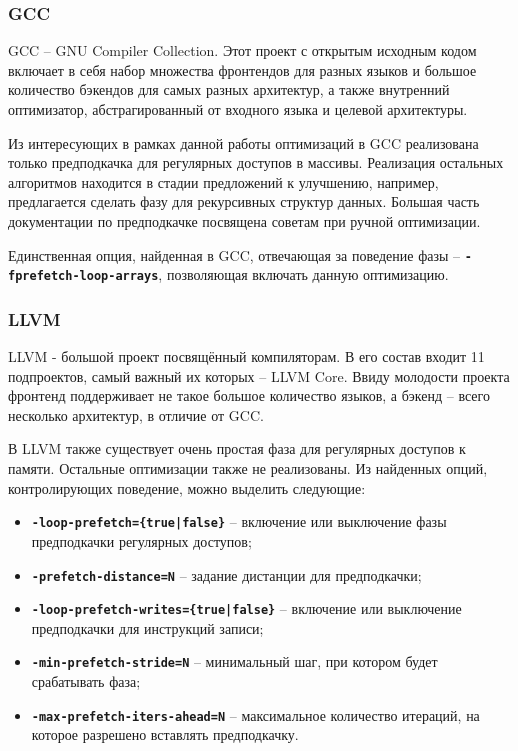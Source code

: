 \documentclass[12pt,a4paper,oneside]{article}
\begin{document}
\subsubsection{GCC}

\indent

GCC -- GNU Compiler Collection. Этот проект с открытым исходным кодом включает в себя набор множества фронтендов для разных языков и большое количество бэкендов для самых разных архитектур, а также внутренний оптимизатор, абстрагированный от входного языка и целевой архитектуры\cite{GCC}.

Из интересующих в рамках данной работы оптимизаций в GCC реализована только предподкачка для регулярных доступов в массивы. Реализация остальных алгоритмов находится в стадии предложений к улучшению, например, предлагается сделать фазу для рекурсивных структур данных. Большая часть документации по предподкачке посвящена советам при ручной оптимизации\cite{GCCPref}.

Единственная опция, найденная в GCC, отвечающая за поведение фазы -- \linebreak \texttt{\textbf{-fprefetch-loop-arrays}}, позволяющая включать данную оптимизацию.

\subsubsection{LLVM}

\indent

LLVM - большой проект посвящённый компиляторам. В его состав входит 11 подпроектов, самый важный их которых -- LLVM Core. Ввиду молодости проекта фронтенд поддерживает не такое большое количество языков, а бэкенд -- всего несколько архитектур, в отличие от GCC\cite{LLVM}.

В LLVM также существует очень простая фаза для регулярных доступов к памяти. Остальные оптимизации также не реализованы. Из найденных опций, контролирующих поведение, можно выделить следующие:
\begin{itemize}
\item \texttt{\textbf{-loop-prefetch=\{true|false\}}} -- включение или выключение фазы предподкачки регулярных доступов;
\item \texttt{\textbf{-prefetch-distance=N}} -- задание дистанции для предподкачки;
\item \texttt{\textbf{-loop-prefetch-writes=\{true|false\}}} -- включение или выключение предподкачки для инструкций записи;
\item \texttt{\textbf{-min-prefetch-stride=N}} -- минимальный шаг, при котором будет срабатывать фаза;
\item \texttt{\textbf{-max-prefetch-iters-ahead=N}} -- максимальное количество итераций, на которое разрешено вставлять предподкачку.
\end{itemize}
\end{document}
